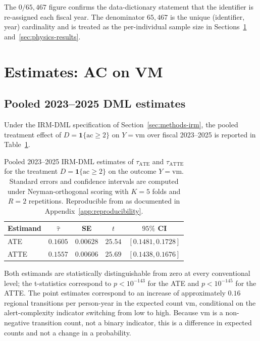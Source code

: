 \documentclass[article,shortnames,nojss]{jss}
\newcommand{\ac}{\ensuremath{\mathrm{ac}}}
\newcommand{\vm}{\ensuremath{\mathrm{vm}}}
\begin{document}
The $0/65{,}467$ figure confirms the data-dictionary statement that
the identifier is re-assigned each fiscal year. The denominator
$65{,}467$ is the unique (identifier, year) cardinality and is
treated as the per-individual sample size in
Sections~\ref{sec:dml} and~\ref{sec:physics-results}.

\section[Estimates: AC on VM]{Estimates: AC on VM}
\label{sec:dml}

\subsection{Pooled 2023--2025 DML estimates}
\label{sec:dml-pooled}

Under the IRM-DML specification of Section~\ref{sec:methods-irm}, the
pooled treatment effect of $D = \mathbf{1}\{\ac \ge 2\}$ on
$Y = \vm$ over fiscal 2023--2025 is reported in
Table~\ref{tab:res-pool}.

\begin{table}[h]
\centering
\caption{Pooled 2023--2025 IRM-DML estimates of $\tau_{\mathrm{ATE}}$
and $\tau_{\mathrm{ATTE}}$ for the treatment
$D = \mathbf{1}\{\ac \ge 2\}$ on the outcome $Y = \vm$. Standard
errors and confidence intervals are computed under
Neyman-orthogonal scoring with $K=5$ folds and $R=2$ repetitions.
Reproducible from  as documented in
Appendix~\ref{app:reproducibility}.}
\label{tab:res-pool}
\begin{tabular}{lcccc}
\toprule
Estimand & $\hat{\tau}$ & SE & $t$ & $95\%$ CI \\
\midrule
ATE  & $0.1605$ & $0.00628$ & $25.54$ & $[0.1481, 0.1728]$ \\
ATTE & $0.1557$ & $0.00606$ & $25.69$ & $[0.1438, 0.1676]$ \\
\bottomrule
\end{tabular}
\end{table}

Both estimands are statistically distinguishable from zero at every
conventional level; the t-statistics correspond to $p < 10^{-143}$
for the ATE and $p < 10^{-145}$ for the ATTE. The point estimates
correspond to an increase of approximately $0.16$ regional
transitions per person-year in the expected count $\vm$,
conditional on the alert-complexity indicator switching from low to
high.  Because $\vm$ is a non-negative transition count, not a
binary indicator, this is a difference in expected counts and not a
change in a probability.
\end{document}
